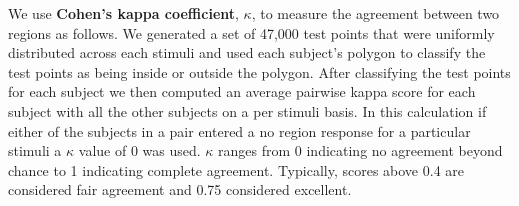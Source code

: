 \documentclass[11pt,letterpaper]{article}
\begin{document}
We use \textbf{Cohen's kappa coefficient}, $\kappa$, to measure the agreement between two regions as follows.  We generated a set of 47,000 test points that were uniformly distributed across each stimuli and used each subject's polygon to classify the test points as being inside or outside the polygon. After classifying the test points for each subject we then computed an average pairwise kappa score for each subject with all the other subjects on a per stimuli basis. In this calculation if either of the subjects in a pair entered a no region response for a particular stimuli a $\kappa$ value of 0 was used.  $\kappa$ ranges from 0 indicating no agreement beyond chance to 1 indicating complete agreement.  Typically, scores above 0.4 are considered fair agreement and 0.75 considered excellent.


\end{document}
